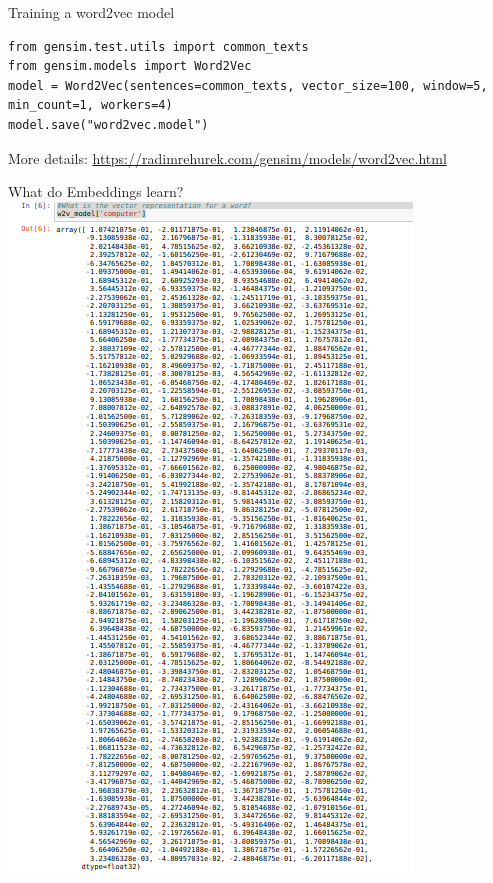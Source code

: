 \documentclass{beamer}
\begin{document}
\begin{frame}[fragile]{Training a word2vec model}
\tiny
    \begin{verbatim}
from gensim.test.utils import common_texts
from gensim.models import Word2Vec
model = Word2Vec(sentences=common_texts, vector_size=100, window=5, min_count=1, workers=4)
model.save("word2vec.model")
    \end{verbatim}
    More details: \url{https://radimrehurek.com/gensim/models/word2vec.html}
\end{frame}

\begin{frame}{What do Embeddings learn?}
    \includegraphics[width=\textwidth]{figures/w2vrep.png}
\end{frame}
\end{document}
